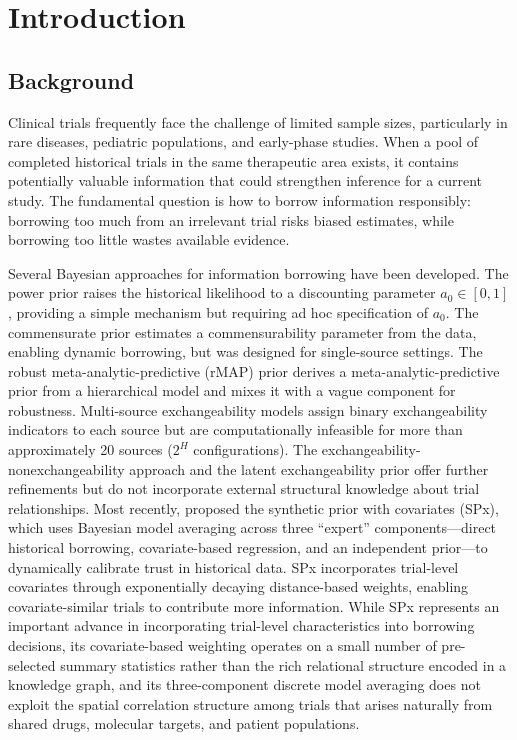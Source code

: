 \documentclass[12pt]{article}
\begin{document}
\newpage

\section{Introduction}
\label{sec:introduction}
\subsection{Background}
Clinical trials frequently face the challenge of limited sample sizes, particularly in rare diseases, pediatric populations, and early-phase studies. When a pool of completed historical trials in the same therapeutic area exists, it contains potentially valuable information that could strengthen inference for a current study. The fundamental question is how to borrow information responsibly: borrowing too much from an irrelevant trial risks biased estimates, while borrowing too little wastes available evidence.

Several Bayesian approaches for information borrowing have been developed. The power prior \citep{ibrahim2000power} raises the historical likelihood to a discounting parameter $a_0 \in [0,1]$, providing a simple mechanism but requiring ad hoc specification of $a_0$. The commensurate prior \citep{hobbs2011hierarchical} estimates a commensurability parameter from the data, enabling dynamic borrowing, but was designed for single-source settings. The robust meta-analytic-predictive (rMAP) prior \citep{schmidli2014robust} derives a meta-analytic-predictive prior from a hierarchical model and mixes it with a vague component for robustness. Multi-source exchangeability models \citep[MEM;][]{kaizer2018bayesian} assign binary exchangeability indicators to each source but are computationally infeasible for more than approximately 20 sources ($2^H$ configurations). The exchangeability-nonexchangeability approach \citep[EXNEX;][]{neuenschwander2016robust} and the latent exchangeability prior \citep[LEAP;][]{alt2024leap} offer further refinements but do not incorporate external structural knowledge about trial relationships. Most recently, \citet{schwartz2024spx} proposed the synthetic prior with covariates (SPx), which uses Bayesian model averaging across three ``expert'' components---direct historical borrowing, covariate-based regression, and an independent prior---to dynamically calibrate trust in historical data. SPx incorporates trial-level covariates through exponentially decaying distance-based weights, enabling covariate-similar trials to contribute more information. While SPx represents an important advance in incorporating trial-level characteristics into borrowing decisions, its covariate-based weighting operates on a small number of pre-selected summary statistics rather than the rich relational structure encoded in a knowledge graph, and its three-component discrete model averaging does not exploit the spatial correlation structure among trials that arises naturally from shared drugs, molecular targets, and patient populations.
\end{document}
